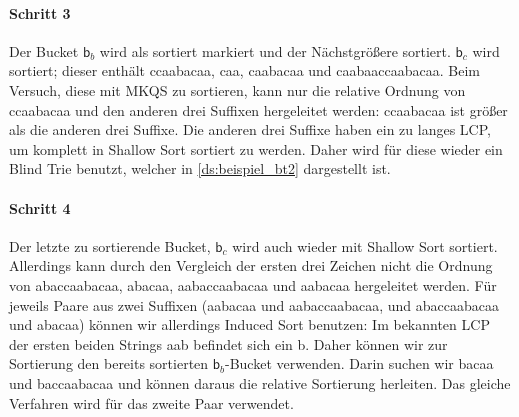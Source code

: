\paragraph{Schritt 3} Der Bucket $\mathsf{b}_b$ wird als sortiert markiert und der Nächstgrößere sortiert.
$\mathsf{b}_c$ wird sortiert; dieser enthält \glqq ccaabacaa\grqq, \glqq caa\grqq, \glqq caabacaa\grqq{} und \glqq caabaaccaabacaa\grqq.
Beim Versuch, diese mit MKQS zu sortieren, kann nur die relative Ordnung von \glqq ccaabacaa\grqq{} und den anderen drei Suffixen hergeleitet werden: \glqq ccaabacaa\grqq{} ist größer als die anderen drei Suffixe.
Die anderen drei Suffixe haben ein zu langes LCP, um komplett in Shallow Sort sortiert zu werden.
Daher wird für diese wieder ein Blind Trie benutzt, welcher in \cref{ds:beispiel_bt2} dargestellt ist.


\paragraph{Schritt 4} Der letzte zu sortierende Bucket, $\mathsf{b}_c$ wird auch wieder mit Shallow Sort sortiert.
Allerdings kann durch den Vergleich der ersten drei Zeichen nicht die Ordnung von \glqq abaccaabacaa\grqq, \glqq abacaa\grqq, \glqq aabaccaabacaa\grqq{} und \glqq aabacaa\grqq{} hergeleitet werden.
Für jeweils Paare aus zwei Suffixen (\glqq aabacaa\grqq{} und \glqq aabaccaabacaa\grqq, und \glqq abaccaabacaa\grqq{} und \glqq abacaa\grqq) können wir allerdings Induced Sort benutzen:
Im bekannten LCP der ersten beiden Strings \glqq aab\grqq{} befindet sich ein \glqq b\grqq.
Daher können wir zur Sortierung den bereits sortierten $\mathsf{b}_b$-Bucket verwenden.
Darin suchen wir \glqq bacaa\grqq{} und \glqq baccaabacaa\grqq{} und können daraus die relative Sortierung herleiten.
Das gleiche Verfahren wird für das zweite Paar verwendet.

